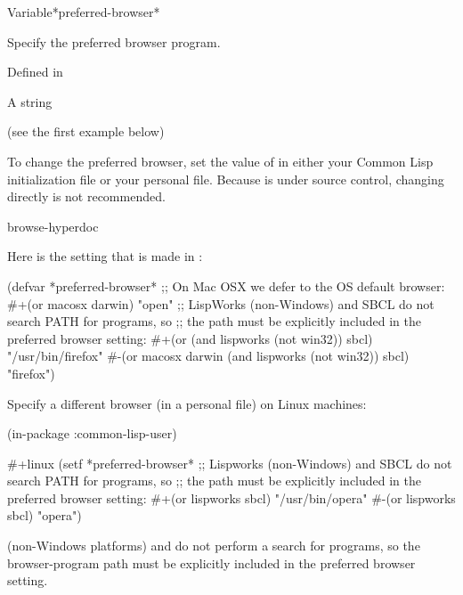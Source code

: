 \documentclass[10pt,twoside,english,pdftex]{article}
\begin{document}
\begin{functiondoc}{Variable}{*preferred-browser*}{}%

\fnsyntax

\fnpurpose Specify the preferred browser program.

\fnpackage {}

\fnmodule Defined in 

\fnvaluetype A string

\fninitialvalue (see the first example below)

\fndescription To change the preferred browser, set the value of
 in either your Common Lisp initialization
file or your personal  file.  Because
 is under
 source control, changing
 directly is not recommended.

\begin{alsos}{browse-hyperdoc}
\end{alsos}

\fnexamples
Here is the setting that is made in :
%
\W\supp
\begin{example}
  (defvar *preferred-browser* 
      ;; On Mac OSX we defer to the OS default browser:
      #+(or macosx darwin)
      "open"
      ;; LispWorks (non-Windows) and SBCL do not search PATH for programs, so
      ;; the path must be explicitly included in the preferred browser setting:
      #+(or (and lispworks (not win32)) sbcl) "/usr/bin/firefox"
      #-(or macosx darwin (and lispworks (not win32)) sbcl) "firefox")
\end{example}

Specify a different browser (in a personal 
file) on Linux machines:
%
\W\supp
\begin{example}
  (in-package :common-lisp-user)

  #+linux
  (setf *preferred-browser* 
    ;; Lispworks (non-Windows) and SBCL do not search PATH for programs, so
    ;; the path must be explicitly included in the preferred browser setting:
     #+(or lispworks sbcl) "/usr/bin/opera"
     #-(or lispworks sbcl) "opera")
\end{example}

\fnnote {} (non-Windows
platforms) and  do not perform a
 search for programs, so the browser-program path must be explicitly
included in the preferred browser setting.

\end{functiondoc}
\end{document}
